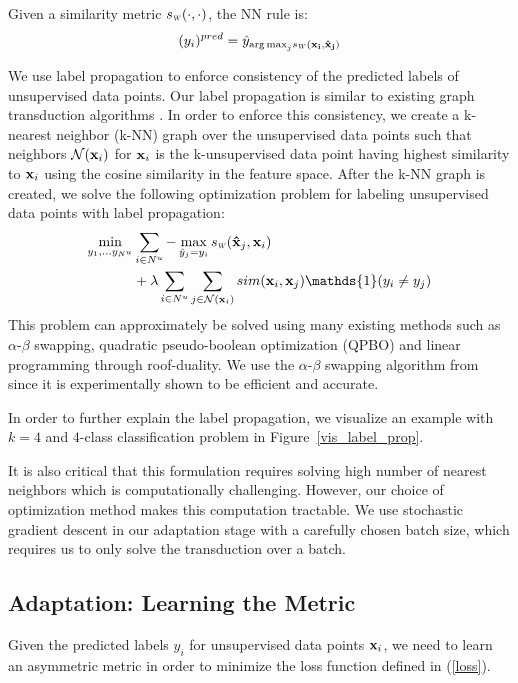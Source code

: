 Given a similarity metric $\sw(\cdot,\cdot)$, the NN rule is:
\begin{equation}
(y_i)^{pred} = \hat{y}_{{\arg\max}_j \sw(\mathbf{x_i}, \mathbf{\hat{x}_j})}
\end{equation}

We use label propagation to enforce consistency of the predicted labels of unsupervised data points. Our label propagation is similar to existing graph transduction algorithms \cite{label_prop1,label_prop2}. In order to enforce this consistency, we create a k-nearest neighbor (k-NN) graph over the unsupervised data points such that neighbors $\mathcal{N}(\mathbf{x}_i)$ for $\mathbf{x}_i$ is the k-unsupervised data point having highest similarity to $\mathbf{x}_i$ using the cosine similarity in the feature space. After the k-NN graph is created, we solve the following optimization problem for labeling unsupervised data points with label propagation:
\begin{equation}
\begin{aligned}
\min_{y_1, \ldots y_{N^u}}  &\sum_{i \in N^u} - \max_{\hat{y}_j=y_i}  \sw(\mathbf{\hat{x}}_j,\mathbf{x}_{i}) \\
&+ \lambda
\sum_{i \in N^u} \sum_{j \in \mathcal{N}(\mathbf{x}_i)} sim(\mathbf{x}_i, \mathbf{x}_j) \mathds{1}(y_i \neq y_j)
\end{aligned}
\label{robtran}
\end{equation}
This problem can approximately be solved using many existing methods such as $\alpha$-$\beta$ swapping, quadratic pseudo-boolean optimization (QPBO) and linear programming through roof-duality. We use the $\alpha$-$\beta$ swapping algorithm from \cite{kolmogrovalphabeta} since it is experimentally shown to be efficient and accurate. 

In order to further explain the label propagation, we visualize an example with $k=4$ and $4$-class classification problem in Figure~\ref{vis_label_prop}. 

It is also critical that this formulation requires solving high number of nearest neighbors which is computationally challenging. However, our choice of optimization method makes this computation tractable. We use stochastic gradient descent in our adaptation stage with a carefully chosen batch size, which requires us to only solve the transduction over a batch. %

\subsection{Adaptation: Learning the Metric}
\label{metric}
Given the predicted labels $y_i$ for unsupervised data points $\mathbf{x}_i$, we need to learn an asymmetric metric in order to minimize the loss function defined in (\ref{loss}). 

